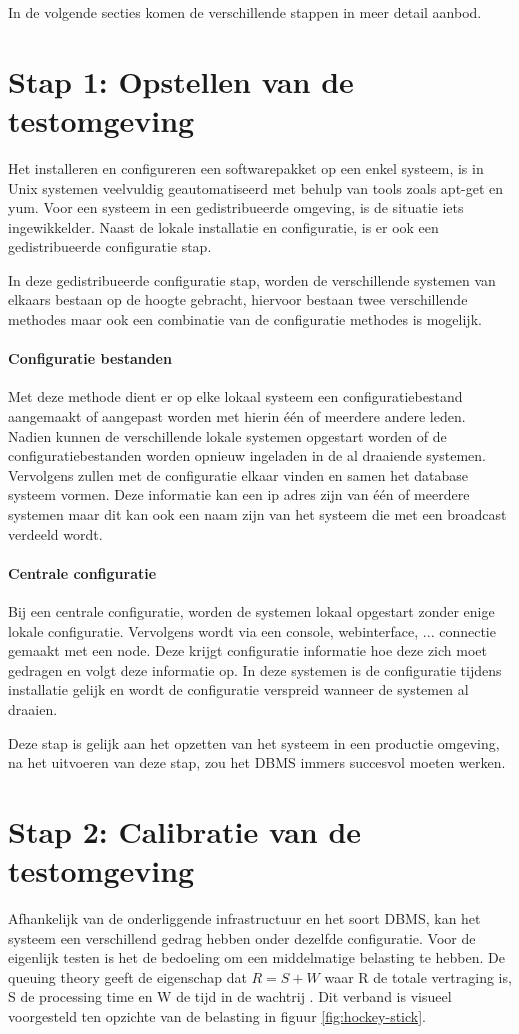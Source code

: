 In de volgende secties komen de verschillende stappen in meer detail aanbod.  

\section{Stap 1: Opstellen van de testomgeving}
Het installeren en configureren een softwarepakket op een enkel systeem, is in Unix systemen veelvuldig geautomatiseerd met behulp van tools zoals \gls{apt-get} en \gls{yum}. Voor een systeem in een gedistribueerde omgeving, is de situatie iets ingewikkelder. Naast de lokale installatie en configuratie, is er ook een gedistribueerde configuratie stap.  

In deze gedistribueerde configuratie stap, worden de verschillende systemen van elkaars bestaan op de hoogte gebracht, hiervoor bestaan twee verschillende methodes maar ook een combinatie van de configuratie methodes is mogelijk.
 
\paragraph{Configuratie bestanden} Met deze methode dient er op elke lokaal systeem een configuratiebestand aangemaakt of aangepast worden met hierin één of meerdere andere leden. Nadien kunnen de verschillende lokale systemen opgestart worden of de configuratiebestanden worden opnieuw ingeladen in de al draaiende systemen. Vervolgens zullen met de configuratie elkaar vinden en samen het database systeem vormen. Deze informatie kan een ip adres zijn van één of meerdere systemen maar dit kan ook een naam zijn van het systeem die met een broadcast verdeeld wordt. 
\paragraph{Centrale configuratie} Bij een centrale configuratie, worden de systemen lokaal opgestart zonder enige lokale configuratie. Vervolgens wordt via een console, webinterface, ... connectie gemaakt met een node. Deze krijgt configuratie informatie hoe deze zich moet gedragen en volgt deze informatie op. In deze systemen is de configuratie tijdens installatie gelijk en wordt de configuratie verspreid wanneer de systemen al draaien.  


Deze stap is gelijk aan het opzetten van het systeem in een productie omgeving, na het uitvoeren van deze stap, zou het DBMS immers succesvol moeten werken. 

\section{Stap 2: Calibratie van de testomgeving}
Afhankelijk van de onderliggende infrastructuur en het soort DBMS, kan het systeem een verschillend gedrag hebben onder dezelfde configuratie. Voor de eigenlijk testen is het de bedoeling om een middelmatige belasting te hebben. De queuing theory geeft de eigenschap dat $R = S + W$ waar R de totale vertraging is, S de processing time en W de tijd in de wachtrij \cite{millsap2003optimizing}. Dit verband is visueel voorgesteld ten opzichte van de belasting in figuur \ref{fig:hockey-stick}. 

